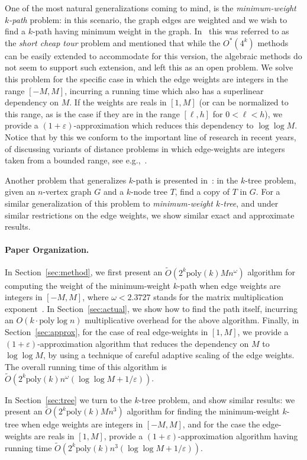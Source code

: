 \documentclass{llncs}
\newcommand{\poly}{\mathrm{poly}}
\begin{document}
One of the most natural generalizations coming to mind, is the \emph{minimum-weight $k$-path} problem: in this scenario, the graph edges are weighted and we wish to find a $k$-path having minimum weight in the graph. In~\cite{Williams09} this was referred to as the \emph{short cheap tour} problem and mentioned that while the $O^*(4^k)$ methods can be easily extended to accommodate for this version, the algebraic methods do not seem to support such extension, and left this as an open problem. We solve this problem for the specific case in which the edge weights are integers in the range $[-M,M]$, incurring a running time which also has a superlinear dependency on $M$. If the weights are reals in $[1,M]$ (or can be normalized to this range, as is the case if they are in the range $[\ell,h]$ for $0 < \ell < h$), we provide a $(1+\varepsilon)$-approximation which reduces this dependency to $\log \log M$. Notice that by this we conform to the important line of research in recent years, of discussing variants of distance problems in which edge-weights are integers taken from a bounded range, see e.g.,~\cite{Zwick02,CGS12}.

Another problem that generalizes $k$-path is presented in~\cite{KW09}: in the $k$-tree problem, given an $n$-vertex graph $G$ and a $k$-node tree $T$, find a copy of $T$ in $G$. For a similar generalization of this problem to \emph{minimum-weight $k$-tree}, and under similar restrictions on the edge weights, we show similar exact and approximate results.
\paragraph{Paper Organization.}
In Section~\ref{sec:method}, we first present an $\tilde{O}(2^k \poly(k) M n^\omega )$ algorithm for computing the weight of the minimum-weight $k$-path when edge weights are integers in $[-M,M]$, where $\omega < 2.3727$ stands for the matrix multiplication exponent~\cite{Williams12}. In Section~\ref{sec:actual}, we show how to find the path itself, incurring an $O(k \cdot \poly\log  n)$ multiplicative overhead for the above algorithm. Finally, in Section~\ref{sec:approx}, for the case of real edge-weights in $[1,M]$, we provide a $(1+\varepsilon)$-approximation algorithm that reduces the dependency on $M$ to $\log\log M$, by using a technique of careful adaptive scaling of the edge weights. The overall running time of this algorithm is $\tilde{O}(2^k \poly(k) n^\omega(\log\log M + 1/\varepsilon))$. 

In Section~\ref{sec:tree} we turn to the $k$-tree problem, and show similar results: we present an $\tilde{O}(2^k \poly(k) M n^3)$ algorithm for finding the minimum-weight $k$-tree when edge weights are integers in $[-M,M]$, and for the case the edge-weights are reals in $[1,M]$, provide a $(1+\varepsilon)$-approximation algorithm having running time $\tilde{O}(2^k \poly(k) n^3(\log\log M + 1/\varepsilon))$. 
\end{document}
